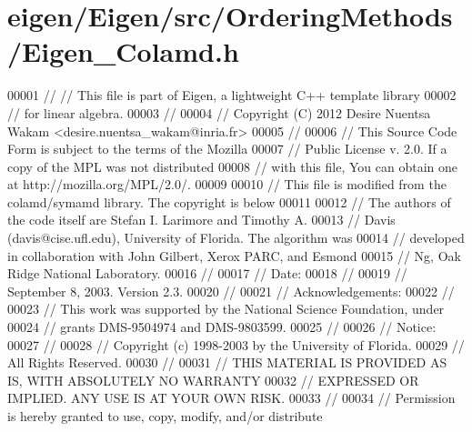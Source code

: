 \hypertarget{eigen_2_eigen_2src_2_ordering_methods_2_eigen___colamd_8h_source}{}\section{eigen/\+Eigen/src/\+Ordering\+Methods/\+Eigen\+\_\+\+Colamd.h}
\label{eigen_2_eigen_2src_2_ordering_methods_2_eigen___colamd_8h_source}

\begin{DoxyCode}
00001 \textcolor{comment}{// // This file is part of Eigen, a lightweight C++ template library}
00002 \textcolor{comment}{// for linear algebra.}
00003 \textcolor{comment}{//}
00004 \textcolor{comment}{// Copyright (C) 2012 Desire Nuentsa Wakam <desire.nuentsa\_wakam@inria.fr>}
00005 \textcolor{comment}{//}
00006 \textcolor{comment}{// This Source Code Form is subject to the terms of the Mozilla}
00007 \textcolor{comment}{// Public License v. 2.0. If a copy of the MPL was not distributed}
00008 \textcolor{comment}{// with this file, You can obtain one at http://mozilla.org/MPL/2.0/.}
00009 
00010 \textcolor{comment}{// This file is modified from the colamd/symamd library. The copyright is below}
00011 
00012 \textcolor{comment}{//   The authors of the code itself are Stefan I. Larimore and Timothy A.}
00013 \textcolor{comment}{//   Davis (davis@cise.ufl.edu), University of Florida.  The algorithm was}
00014 \textcolor{comment}{//   developed in collaboration with John Gilbert, Xerox PARC, and Esmond}
00015 \textcolor{comment}{//   Ng, Oak Ridge National Laboratory.}
00016 \textcolor{comment}{// }
00017 \textcolor{comment}{//     Date:}
00018 \textcolor{comment}{// }
00019 \textcolor{comment}{//   September 8, 2003.  Version 2.3.}
00020 \textcolor{comment}{// }
00021 \textcolor{comment}{//     Acknowledgements:}
00022 \textcolor{comment}{// }
00023 \textcolor{comment}{//   This work was supported by the National Science Foundation, under}
00024 \textcolor{comment}{//   grants DMS-9504974 and DMS-9803599.}
00025 \textcolor{comment}{// }
00026 \textcolor{comment}{//     Notice:}
00027 \textcolor{comment}{// }
00028 \textcolor{comment}{//   Copyright (c) 1998-2003 by the University of Florida.}
00029 \textcolor{comment}{//   All Rights Reserved.}
00030 \textcolor{comment}{// }
00031 \textcolor{comment}{//   THIS MATERIAL IS PROVIDED AS IS, WITH ABSOLUTELY NO WARRANTY}
00032 \textcolor{comment}{//   EXPRESSED OR IMPLIED.  ANY USE IS AT YOUR OWN RISK.}
00033 \textcolor{comment}{// }
00034 \textcolor{comment}{//   Permission is hereby granted to use, copy, modify, and/or distribute}

\end{DoxyCode}
